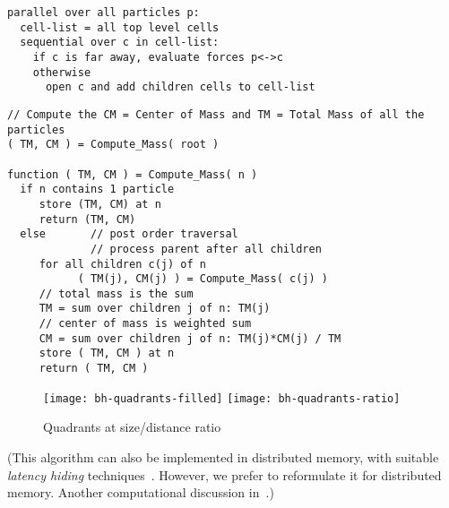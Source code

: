 \begin{verbatim}
parallel over all particles p:
  cell-list = all top level cells
  sequential over c in cell-list:
    if c is far away, evaluate forces p<->c
    otherwise
      open c and add children cells to cell-list
\end{verbatim}

\begin{verbatim}
// Compute the CM = Center of Mass and TM = Total Mass of all the particles 
( TM, CM ) = Compute_Mass( root )

function ( TM, CM ) = Compute_Mass( n )
  if n contains 1 particle
     store (TM, CM) at n
     return (TM, CM)
  else       // post order traversal
             // process parent after all children
     for all children c(j) of n
           ( TM(j), CM(j) ) = Compute_Mass( c(j) )
     // total mass is the sum
     TM = sum over children j of n: TM(j)
     // center of mass is weighted sum
     CM = sum over children j of n: TM(j)*CM(j) / TM
     store ( TM, CM ) at n
     return ( TM, CM )
\end{verbatim}

\begin{figure}[ht]
  \texttt{[image: bh-quadrants-filled]}
  \texttt{[image: bh-quadrants-ratio]}
  \caption{Quadrants at size/distance ratio}
  \label{fig:bh-quadrants}
\end{figure}


(This algorithm can also be implemented in distributed memory, with suitable
\emph{latency hiding}
techniques~\cite{Warren:1993:hash-octree}. However, we prefer
to reformulate it for distributed memory.
Another computational discussion in~\cite{Agullo:pipeFMMinria}.)

